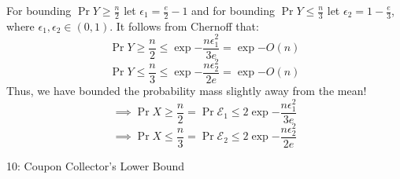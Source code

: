 \documentclass[12pt]{article}
\begin{document}
\begin{solution}
\begin{enumerate}[label=(\alph*)]
For bounding $\Pr{Y \geq \frac{n}{2}}$ let $\epsilon_1 = \frac{e}{2} - 1$ and for  bounding $\Pr{Y \leq \frac{n}{3}}$ let $\epsilon_2 = 1 - \frac{e}{3}$, where $\epsilon_1,\epsilon_2 \in (0,1)$. It follows from Chernoff that:
\[
\Pr{Y \geq \frac{n}{2}} \leq \exp{-\frac{n\epsilon_{1}^2}{3e}} = \exp{-O(n)}
\]
\[
\Pr{Y \leq \frac{n}{3}} \leq \exp{-\frac{n\epsilon_{2}^2}{2e}} = \exp{-O(n)}
\]
Thus, we have bounded the probability mass slightly away from the mean! 
\[
\implies \Pr{X \geq \frac{n}{2}} =\Pr{\mathcal{E}_1} \leq 2\exp{-\frac{n\epsilon_{1}^2}{3e}}
\]
\[
\implies \Pr{X \leq \frac{n}{3}} = \Pr{\mathcal{E}_2} \leq 2\exp{-\frac{n\epsilon_{2}^2}{2e}}
\]

\end{enumerate}
\end{solution}

\begin{problem}{10: Coupon Collector's Lower Bound}
\end{problem}
\end{document}
